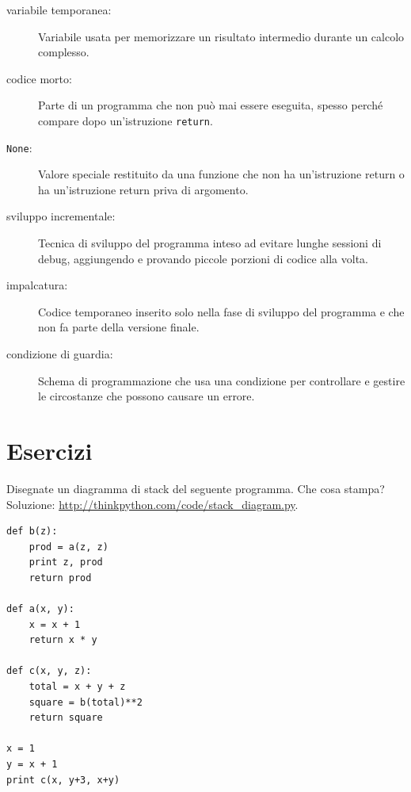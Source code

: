 \documentclass[10pt]{book}
\begin{document}
\begin{description}

\item[variabile temporanea:]  Variabile usata per memorizzare un risultato intermedio durante un calcolo complesso.

\item[codice morto:]  Parte di un programma che non può mai essere eseguita, spesso perché compare dopo un'istruzione {\tt return}.

\item[{\tt None}:]  Valore speciale restituito da una funzione che non ha
          un'istruzione return o ha un'istruzione return priva di argomento.

\item[sviluppo incrementale:]  Tecnica di sviluppo del programma inteso ad evitare lunghe sessioni di debug, aggiungendo e provando piccole porzioni di codice alla volta.

\item[impalcatura:]  Codice temporaneo inserito solo nella fase di sviluppo del programma e che non fa parte della versione finale.

\item[condizione di guardia:]  Schema di programmazione che usa una condizione per controllare e gestire le circostanze che possono causare un errore.

\end{description}


\section{Esercizi}

\begin{exercise}

Disegnate un diagramma di stack del seguente programma. Che cosa stampa?
Soluzione: \url{http://thinkpython.com/code/stack_diagram.py}.

\begin{verbatim}
def b(z):
    prod = a(z, z)
    print z, prod
    return prod

def a(x, y):
    x = x + 1
    return x * y

def c(x, y, z):
    total = x + y + z
    square = b(total)**2
    return square

x = 1
y = x + 1
print c(x, y+3, x+y)
\end{verbatim}

\end{exercise}
\end{document}
